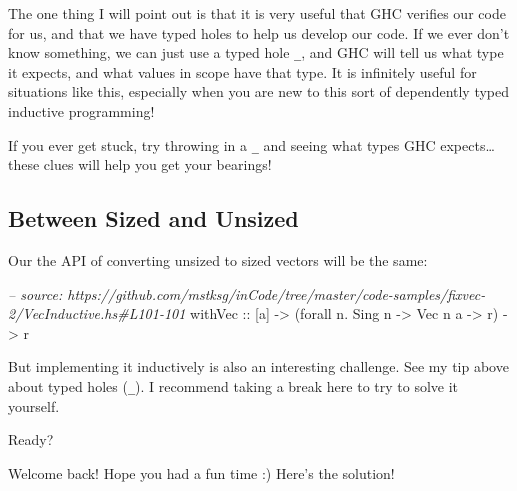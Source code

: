 \documentclass[]{article}
\newenvironment{Shaded}{}{}
\newcommand{\KeywordTok}[1]{\textcolor[rgb]{0.00,0.44,0.13}{\textbf{#1}}}
\newcommand{\DataTypeTok}[1]{\textcolor[rgb]{0.56,0.13,0.00}{#1}}
\newcommand{\CommentTok}[1]{\textcolor[rgb]{0.38,0.63,0.69}{\textit{#1}}}
\newcommand{\OtherTok}[1]{\textcolor[rgb]{0.00,0.44,0.13}{#1}}
\newcommand{\FunctionTok}[1]{\textcolor[rgb]{0.02,0.16,0.49}{#1}}
\newcommand{\NormalTok}[1]{#1}
\begin{document}
The one thing I will point out is that it is very useful that GHC verifies our
code for us, and that we have typed holes to help us develop our code. If we
ever don't know something, we can just use a typed hole \texttt{\_}, and GHC
will tell us what type it expects, and what values in scope have that type. It
is infinitely useful for situations like this, especially when you are new to
this sort of dependently typed inductive programming!

If you ever get stuck, try throwing in a \texttt{\_} and seeing what types GHC
expects\ldots{}these clues will help you get your bearings!

\subsection{Between Sized and Unsized}\label{between-sized-and-unsized}

Our the API of converting unsized to sized vectors will be the same:

\begin{Shaded}
\begin{Highlighting}[]
\CommentTok{-- source: https://github.com/mstksg/inCode/tree/master/code-samples/fixvec-2/VecInductive.hs#L101-101}
\OtherTok{withVec ::}\NormalTok{ [a] }\OtherTok{->}\NormalTok{ (forall n}\FunctionTok{.} \DataTypeTok{Sing}\NormalTok{ n }\OtherTok{->} \DataTypeTok{Vec}\NormalTok{ n a }\OtherTok{->}\NormalTok{ r) }\OtherTok{->}\NormalTok{ r}
\end{Highlighting}
\end{Shaded}

But implementing it inductively is also an interesting challenge. See my tip
above about typed holes (\texttt{\_}). I recommend taking a break here to try to
solve it yourself.

Ready?

Welcome back! Hope you had a fun time :) Here's the solution!

\begin{Shaded}
\end{Shaded}
\end{document}
